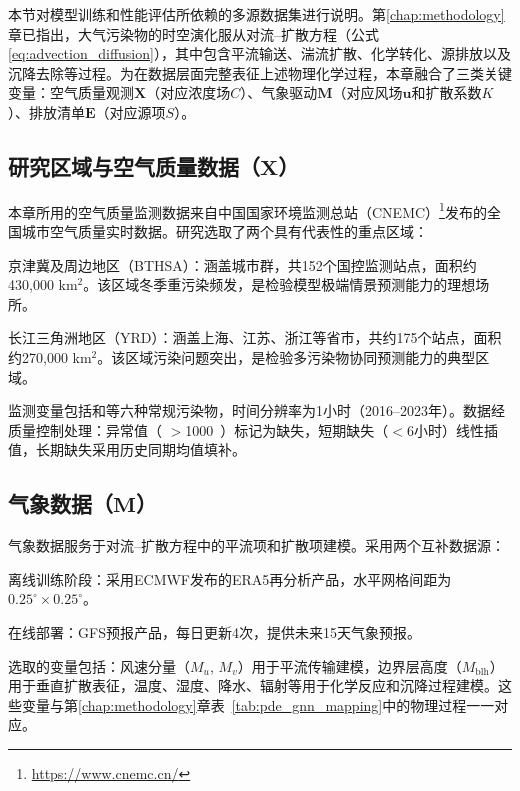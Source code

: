 本节对模型训练和性能评估所依赖的多源数据集进行说明。第\ref{chap:methodology}章已指出，大气污染物的时空演化服从对流--扩散方程（公式\eqref{eq:advection_diffusion}），其中包含平流输送、湍流扩散、化学转化、源排放以及沉降去除等过程。为在数据层面完整表征上述物理化学过程，本章融合了三类关键变量：空气质量观测$\mathbf{X}$（对应浓度场$C$）、气象驱动$\mathbf{M}$（对应风场$\mathbf{u}$和扩散系数$K$）、排放清单$\mathbf{E}$（对应源项$S$）。

\subsection[研究区域与空气质量数据（\texorpdfstring{$\mathbf{X}$}{X}）]{研究区域与空气质量数据（$\mathbf{X}$）}
\label{subsec:aq_data}

本章所用的空气质量监测数据来自中国国家环境监测总站（CNEMC）\footnote{\url{https://www.cnemc.cn/}}发布的全国城市空气质量实时数据。研究选取了两个具有代表性的重点区域：

京津冀及周边地区（BTHSA）：涵盖城市群，共152个国控监测站点，面积约430,000 km$^2$。该区域冬季重污染频发，是检验模型极端情景预测能力的理想场所。

长江三角洲地区（YRD）：涵盖上海、江苏、浙江等省市，共约175个站点，面积约270,000 km$^2$。该区域\ozone 污染问题突出，是检验多污染物协同预测能力的典型区域。

监测变量包括\PM 和\ozone 等六种常规污染物，时间分辨率为1小时（2016--2023年）。数据经质量控制处理：异常值（\PM{} $>$1000~\ug{}）标记为缺失，短期缺失（$<$6小时）线性插值，长期缺失采用历史同期均值填补。

\subsection[气象数据（\texorpdfstring{$\mathbf{M}$}{M}）]{气象数据（$\mathbf{M}$）}
\label{subsec:meteo_data}

气象数据服务于对流--扩散方程中的平流项和扩散项建模。采用两个互补数据源：

离线训练阶段：采用ECMWF发布的ERA5再分析产品\citep{hersbach2020era5}，水平网格间距为$0.25^{\circ} \times 0.25^{\circ}$。

在线部署：GFS预报产品，每日更新4次，提供未来15天气象预报。

选取的变量包括：风速分量（$M_u$, $M_v$）用于平流传输建模，边界层高度（$M_{\text{blh}}$）用于垂直扩散表征，温度、湿度、降水、辐射等用于化学反应和沉降过程建模。这些变量与第\ref{chap:methodology}章表~\ref{tab:pde_gnn_mapping}中的物理过程一一对应。

